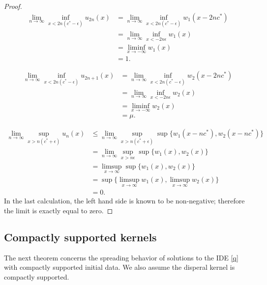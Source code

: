 \documentclass[11pt]{article}
\theoremstyle{definition}
\numberwithin{equation}{section}
\numberwithin{thm}{section}
\newcommand{\m}{\mu}
\begin{document}
\begin{proof}
\begin{equation} \begin{aligned}
\lim_{n\to\infty}\inf_{x<2n(c^*-\epsilon)}u_{2n}(x)
&= \lim_{n\to\infty}\inf_{x<2n(c^*-\epsilon)}w_1(x-2nc^*) \\
&= \lim_{n\to\infty}\inf_{x<-2n\epsilon}w_1(x) \\
&= \liminf_{x\to-\infty}w_1(x) \\ &= 1.
\end{aligned} \end{equation}

\begin{equation} \begin{aligned}
\lim_{n\to\infty}\inf_{x<2n(c^*-\epsilon)}u_{2n+1}(x)
&= \lim_{n\to\infty}\inf_{x<2n(c^*-\epsilon)}w_2(x-2nc^*) \\
&= \lim_{n\to\infty}\inf_{x<-2n\epsilon}w_2(x) \\
&= \liminf_{x\to-\infty}w_2(x) \\ &= \m.
\end{aligned} \end{equation}

\begin{equation} \begin{aligned}
\lim_{n\to\infty} \sup_{x>n(c^*+\epsilon)} u_n(x) 
&\leq \lim_{n\to\infty} \sup_{x>n(c^*+\epsilon)} \sup\{w_1(x-nc^*),w_2(x-nc^*)\} \\
&= \lim_{n\to\infty} \sup_{x>n\epsilon} \sup\{w_1(x),w_2(x)\} \\
&= \limsup_{x\to\infty} \sup\{w_1(x),w_2(x)\} \\ 
&= \sup\{\limsup_{x\to\infty} w_1(x),\limsup_{x\to\infty} w_2(x)\} \\
&= 0.
\end{aligned} \end{equation}
In the last calculation, the left hand side is known to be non-negative; therefore the limit is exactly equal to zero.
\end{proof}

\subsection{Compactly supported kernels}

The next theorem concerns the spreading behavior of solutions to the IDE \eqref{q} with compactly supported initial data. We also assume the disperal kernel is compactly supported.%
\end{document}
